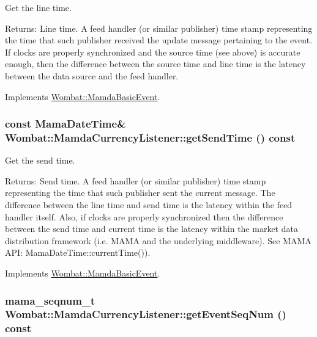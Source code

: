 Get the line time. 

\begin{Desc}
\item[Returns:]Line time. A feed handler (or similar publisher) time stamp representing the time that such publisher received the update message pertaining to the event. If clocks are properly synchronized and the source time (see above) is accurate enough, then the difference between the source time and line time is the latency between the data source and the feed handler. \end{Desc}


Implements \hyperlink{classWombat_1_1MamdaBasicEvent_3fcc26fa1a6446bcec12b11ac74ed26d}{Wombat::Mamda\-Basic\-Event}.\hypertarget{classWombat_1_1MamdaCurrencyListener_dc787103b73d10a395458a270e78d69b}{
\subsubsection[getSendTime]{\setlength{\rightskip}{0pt plus 5cm}const Mama\-Date\-Time\& Wombat::Mamda\-Currency\-Listener::get\-Send\-Time () const}}
\label{classWombat_1_1MamdaCurrencyListener_dc787103b73d10a395458a270e78d69b}


Get the send time. 

\begin{Desc}
\item[Returns:]Send time. A feed handler (or similar publisher) time stamp representing the time that such publisher sent the current message. The difference between the line time and send time is the latency within the feed handler itself. Also, if clocks are properly synchronized then the difference between the send time and current time is the latency within the market data distribution framework (i.e. MAMA and the underlying middleware). See MAMA API: Mama\-Date\-Time::current\-Time()). \end{Desc}


Implements \hyperlink{classWombat_1_1MamdaBasicEvent_b0602a83bec20cd8b341ec866ff3bffa}{Wombat::Mamda\-Basic\-Event}.\hypertarget{classWombat_1_1MamdaCurrencyListener_4d9a6975f01379ea3f3bfbf11ae1fb13}{
\subsubsection[getEventSeqNum]{\setlength{\rightskip}{0pt plus 5cm}mama\_\-seqnum\_\-t Wombat::Mamda\-Currency\-Listener::get\-Event\-Seq\-Num () const}}
\label{classWombat_1_1MamdaCurrencyListener_4d9a6975f01379ea3f3bfbf11ae1fb13}


